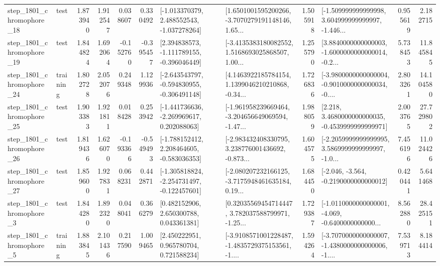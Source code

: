 \begin{tabular}{llrrrrllrlrr}
 step\_1801\_chromophore\_18 &      test &      1.873940 &    1.912547 &      0.038607 &  0.330492 &   [-1.013370379, 2.488552543, -1.037278264] &  [1.6501001595200266, -3.7070279191148146, 1.65... &       1.505918 &  [-1.509999999999998, 3.604999999999997, -1.446... &            0.955619 &          2.182715 \\
 step\_1801\_chromophore\_19 &      test &      1.844824 &    1.692064 &     -0.152760 & -0.395457 &   [2.394838573, -1.111789155, -0.396046449] &  [-3.4135383180082552, 1.5168693025868507, 1.00... &       1.255790 &  [3.8840000000000003, -1.6000000000000014, -0.2... &            5.738453 &         11.845845 \\
 step\_1801\_chromophore\_24 &  training &      1.802728 &    2.052076 &      0.249348 &  1.129936 &  [-2.643543797, -0.594830955, -0.306491148] &  [4.1463922185784154, 1.1399046210210868, -0.34... &       1.726836 &  [-3.9800000000000004, -0.9010000000000034, -0.... &            2.803261 &         14.104580 \\
 step\_1801\_chromophore\_25 &      test &      1.903383 &    1.921811 &      0.018428 &  0.253942 &   [-1.441736636, -2.269969617, 0.202088063] &  [-1.961958239669464, -3.204656649069594, -1.47... &       1.988059 &   [2.218, 3.4680000000000035, -0.4539999999999971] &            2.003765 &         27.729802 \\
 step\_1801\_chromophore\_26 &      test &      1.819436 &    1.626070 &     -0.193366 & -0.549493 &   [-1.788152412, 2.208464605, -0.583036353] &  [-2.983432408330795, 3.238776001436692, -0.873... &       1.604575 &  [-2.2059999999999995, 3.5869999999999997, -1.0... &            7.456196 &         11.024426 \\
 step\_1801\_chromophore\_27 &      test &      1.859600 &    1.927831 &      0.068231 &  0.442871 &  [-1.305818824, -2.254731497, -0.122457601] &  [-2.080207232166125, -3.7175948461635184, 0.19... &       1.684450 &              [-2.046, -3.564, -0.2190000000000012] &            0.420441 &          5.641468 \\
  step\_1801\_chromophore\_3 &      test &      1.844280 &    1.892320 &      0.048041 &  0.366279 &     [0.482152906, 2.650300788, 0.043361381] &  [0.32035569454714447, 3.782037588799971, -1.25... &       1.729387 &  [-1.0110000000000001, -4.069, -0.6400000000000... &            8.562880 &         28.425151 \\
  step\_1801\_chromophore\_5 &  training &      1.883845 &    2.101436 &      0.217590 &  1.009465 &     [2.450222951, 0.965780704, 0.721588234] &  [-3.9108571001228487, -1.4835729375153561, -1.... &       1.594264 &  [-3.7070000000000007, -1.4380000000000006, -1.... &            7.539713 &          8.184414 \\

\end{tabular}
